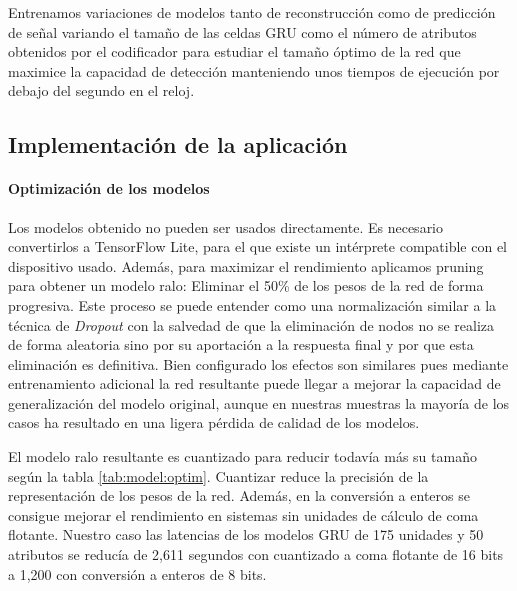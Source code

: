 \documentclass[11pt,a4paper,spanish,twocolumn]{article}
\begin{document}
Entrenamos variaciones de modelos tanto de reconstrucción como de predicción de señal variando el tamaño de las celdas GRU como el número de atributos obtenidos por el codificador para estudiar el tamaño óptimo de la red que maximice la capacidad de detección manteniendo unos tiempos de ejecución por debajo del segundo en el reloj.

\subsection{Implementación de la aplicación}

\paragraph{Optimización de los modelos}
Los modelos obtenido no pueden ser usados directamente. Es necesario convertirlos a TensorFlow Lite, para el que existe un intérprete compatible con el dispositivo usado. Además, para maximizar el rendimiento aplicamos pruning para obtener un modelo ralo: Eliminar el 50\% de los pesos de la red de forma progresiva. Este proceso se puede entender como una normalización similar a la técnica de \textit{Dropout} con la salvedad de que la eliminación de nodos no se realiza de forma aleatoria sino por su aportación a la respuesta final y por que esta eliminación es definitiva. Bien configurado los efectos son similares pues mediante entrenamiento adicional la red resultante puede llegar a mejorar la capacidad de generalización del modelo original\cite{Cai2020}, aunque en nuestras muestras la mayoría de los casos ha resultado en una ligera pérdida de calidad de los modelos.

El modelo ralo resultante es cuantizado para reducir todavía más su tamaño según la tabla \ref{tab:model:optim}. Cuantizar reduce la precisión de la representación de los pesos de la red. Además, en la conversión a enteros se consigue mejorar el rendimiento en sistemas sin unidades de cálculo de coma flotante. Nuestro caso las latencias de los modelos GRU de 175 unidades y 50 atributos se reducía de 2,611 segundos con cuantizado a coma flotante de 16 bits a 1,200 con conversión a enteros de 8 bits.

\begin{table}\caption{\label{tab:model:optim} Reducción del tamaño del modelo en MBytes con cada técnica de optmización}
\end{table}
\end{document}
